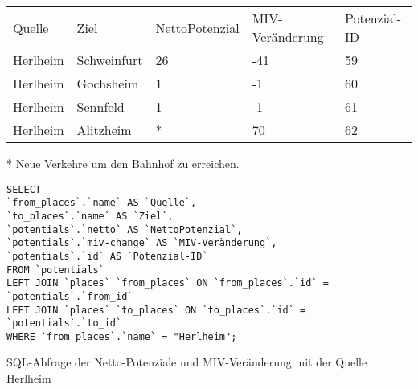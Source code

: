 \begin{tabular}{ l  l  l  l  l }
Quelle & Ziel & NettoPotenzial & MIV-Veränderung & Potenzial-ID\\ 
Herlheim & Schweinfurt & 26 & -41 & 59\\ 
Herlheim & Gochsheim & 1 & -1 & 60\\ 
Herlheim & Sennfeld & 1 & -1 & 61\\ 
Herlheim & Alitzheim & * & 70 & 62\\ 
\end{tabular}    
\newline
\newline
* Neue Verkehre um den Bahnhof zu erreichen.
\newline
\begin{listing}[htbp]
\begin{verbatim}
SELECT
`from_places`.`name` AS `Quelle`, 
`to_places`.`name` AS `Ziel`, 
`potentials`.`netto` AS `NettoPotenzial`, 
`potentials`.`miv-change` AS `MIV-Veränderung`, 
`potentials`.`id` AS `Potenzial-ID`
FROM `potentials`
LEFT JOIN `places` `from_places` ON `from_places`.`id` = `potentials`.`from_id`
LEFT JOIN `places` `to_places` ON `to_places`.`id` = `potentials`.`to_id`
WHERE `from_places`.`name` = "Herlheim";
\end{verbatim}
\caption{SQL-Abfrage der Netto-Potenziale und MIV-Veränderung mit der Quelle Herlheim}\label{lst-fz-herlheim}
\end{listing}